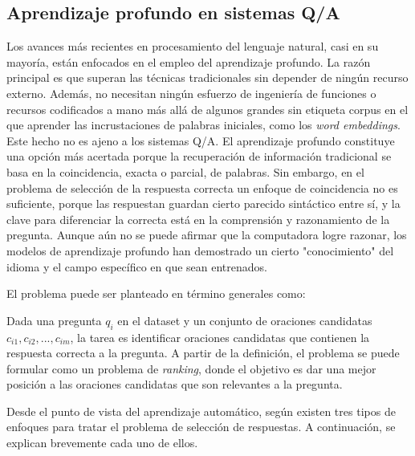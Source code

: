 \subsection{Aprendizaje profundo en sistemas Q/A}

Los avances más recientes en procesamiento del lenguaje natural, casi en su mayoría, están enfocados en el empleo del aprendizaje profundo. La razón principal es que superan las técnicas tradicionales sin depender de ningún recurso externo. Además, no necesitan ningún esfuerzo de ingeniería de funciones o recursos codificados a mano más allá de algunos grandes sin etiqueta corpus en el que aprender las incrustaciones de palabras iniciales, como los \textit{word embeddings}. Este hecho no es ajeno a los sistemas Q/A. El aprendizaje profundo constituye una opción más acertada porque la recuperación de información tradicional se basa en la coincidencia, exacta o parcial, de palabras. Sin embargo, en el problema de selección de la respuesta correcta un enfoque de coincidencia no es suficiente, porque las respuestan guardan cierto parecido sintáctico entre sí, y la clave para diferenciar la correcta está en la comprensión y razonamiento de la pregunta. Aunque aún no se puede afirmar que la computadora logre razonar, los modelos de aprendizaje profundo han demostrado un cierto "conocimiento" del idioma y el campo específico en que sean entrenados.

El problema puede ser planteado en término generales como: 

Dada una pregunta $q_{i}$ en el dataset y un conjunto de oraciones candidatas ${c_{i1}, c_{i2}, ..., c_{im}}$, la tarea es identificar oraciones candidatas que contienen
la respuesta correcta a la pregunta. A partir de la definición, el problema se puede formular como un problema de \textit{ranking}, donde el objetivo es dar una mejor posición a las oraciones candidatas que son relevantes a la pregunta.

Desde el punto de vista del aprendizaje automático, según \cite{2018-lai-review} existen tres tipos de enfoques para tratar el problema de selección de respuestas. A continuación, se explican brevemente cada uno de ellos.

